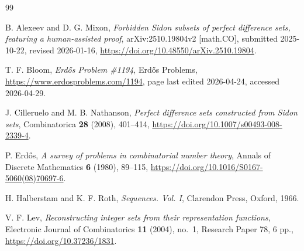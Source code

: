 \documentclass[11pt]{article}
\begin{document}
\begin{thebibliography}{99}

B. Alexeev and D. G. Mixon,
\emph{Forbidden Sidon subsets of perfect difference sets, featuring a human-assisted proof},
arXiv:2510.19804v2 [math.CO], submitted 2025-10-22, revised 2026-01-16,
\url{https://doi.org/10.48550/arXiv.2510.19804}.

T. F. Bloom,
\emph{Erd\H{o}s Problem \#1194},
Erd\H{o}s Problems,
\url{https://www.erdosproblems.com/1194},
page last edited 2026-04-24, accessed 2026-04-29.

J. Cilleruelo and M. B. Nathanson,
\emph{Perfect difference sets constructed from Sidon sets},
Combinatorica \textbf{28} (2008), 401--414,
\url{https://doi.org/10.1007/s00493-008-2339-4}.

P. Erd\H{o}s,
\emph{A survey of problems in combinatorial number theory},
Annals of Discrete Mathematics \textbf{6} (1980), 89--115,
\url{https://doi.org/10.1016/S0167-5060(08)70697-6}.

H. Halberstam and K. F. Roth,
\emph{Sequences. Vol. I},
Clarendon Press, Oxford, 1966.

V. F. Lev,
\emph{Reconstructing integer sets from their representation functions},
Electronic Journal of Combinatorics \textbf{11} (2004), no.~1, Research Paper 78, 6 pp.,
\url{https://doi.org/10.37236/1831}.

\end{thebibliography}
\end{document}
